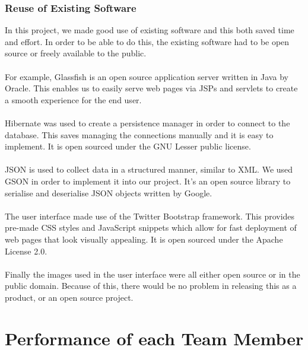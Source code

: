 \documentclass[titlepage]{article}
\begin{document}
{\subsubsection{Reuse of Existing Software}
In this project, we made good use of existing software and this both saved time and effort. In order to be able to do this, the existing software had to be open source or freely available to the public.
\\
\\
For example, Glassfish is an open source application server written in Java by Oracle. This enables us to easily serve web pages via JSPs and servlets to create a smooth experience for the end user.
\\
\\
Hibernate was used to create a persistence manager in order to connect to the database. This saves managing the connections manually and it is easy to implement. It is open sourced under the GNU Lesser public license.
\\
\\
JSON is used to collect data in a structured manner, similar to XML. We used GSON in order to implement it into our project. It's an open source library to serialise and deserialise JSON objects written by Google.
\\
\\
The user interface made use of the Twitter Bootstrap framework. This provides pre-made CSS styles and JavaScript snippets which allow for fast deployment of web pages that look visually appealing. It is open sourced under the Apache License 2.0.
\\
\\
Finally the images used in the user interface were all either open source or in the public domain. Because of this, there would be no problem in releasing this as a product, or an open source project.
\section {Performance of each Team Member}
}
\end{document}
